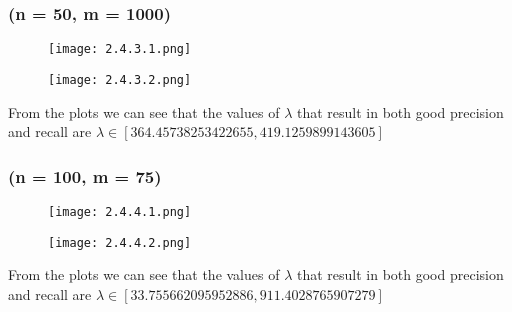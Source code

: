 \documentclass{article}
\begin{document}
\subsubsection*{(n = 50, m = 1000)}
\begin{figure}[h]
    \centering
    \begin{minipage}{0.45\linewidth}
        \centering
        \texttt{[image: 2.4.3.1.png]}
    \end{minipage}%
    \hspace{0.05\linewidth} %
    \begin{minipage}{0.45\linewidth}
        \centering
        \texttt{[image: 2.4.3.2.png]}
    \end{minipage}
\end{figure}
From the plots we can see that the values of $\lambda$ that result in both good precision and recall are $\lambda \in [364.45738253422655, 419.1259899143605]$


\subsubsection*{(n = 100, m = 75)}
\begin{figure}[h]
    \centering
    \begin{minipage}{0.45\linewidth}
        \centering
        \texttt{[image: 2.4.4.1.png]}
    \end{minipage}%
    \hspace{0.05\linewidth} %
    \begin{minipage}{0.45\linewidth}
        \centering
        \texttt{[image: 2.4.4.2.png]}
    \end{minipage}
\end{figure}
From the plots we can see that the values of $\lambda$ that result in both good precision and recall are $\lambda \in [33.755662095952886, 911.4028765907279]$

\newpage
\end{document}
